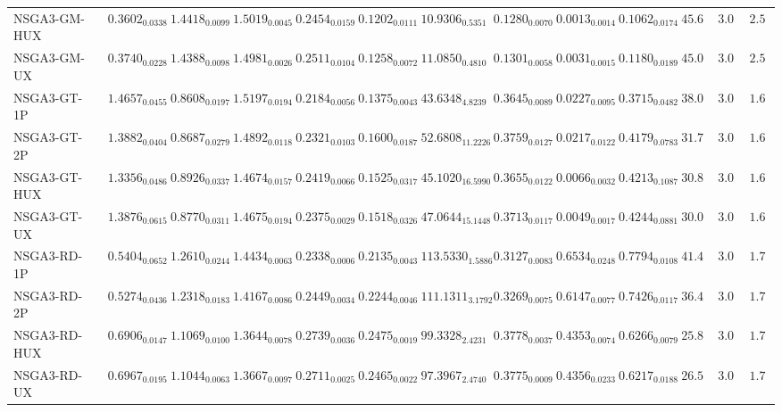 \documentclass[11pt,a4paper]{article}
\begin{document}
\begin{table}[H]
{\begin{tabular}{lcccccccccccc}
NSGA3-GM-HUX & $0.3602_{0.0338}$ & $1.4418_{0.0099}$ & $1.5019_{0.0045}$ & $0.2454_{0.0159}$ & $0.1202_{0.0111}$ & $10.9306_{0.5351}$ & $0.1280_{0.0070}$ & $\mathbf{0.0013}_{0.0014}$ & $0.1062_{0.0174}$ & $45.67$ & $3.00$ & $2.56$ \\
NSGA3-GM-UX & $0.3740_{0.0228}$ & $1.4388_{0.0098}$ & $1.4981_{0.0026}$ & $0.2511_{0.0104}$ & $0.1258_{0.0072}$ & $11.0850_{0.4810}$ & $0.1301_{0.0058}$ & $0.0031_{0.0015}$ & $0.1180_{0.0189}$ & $45.00$ & $3.00$ & $2.56$ \\
NSGA3-GT-1P & $1.4657_{0.0455}$ & $0.8608_{0.0197}$ & $1.5197_{0.0194}$ & $0.2184_{0.0056}$ & $0.1375_{0.0043}$ & $43.6348_{4.8239}$ & $0.3645_{0.0089}$ & $0.0227_{0.0095}$ & $0.3715_{0.0482}$ & $38.00$ & $3.00$ & $\mathbf{1.67}$ \\
NSGA3-GT-2P & $1.3882_{0.0404}$ & $0.8687_{0.0279}$ & $1.4892_{0.0118}$ & $0.2321_{0.0103}$ & $0.1600_{0.0187}$ & $52.6808_{11.2226}$ & $0.3759_{0.0127}$ & $0.0217_{0.0122}$ & $0.4179_{0.0783}$ & $31.78$ & $3.00$ & $\mathbf{1.67}$ \\
NSGA3-GT-HUX & $1.3356_{0.0486}$ & $0.8926_{0.0337}$ & $1.4674_{0.0157}$ & $0.2419_{0.0066}$ & $0.1525_{0.0317}$ & $45.1020_{16.5990}$ & $0.3655_{0.0122}$ & $0.0066_{0.0032}$ & $0.4213_{0.1087}$ & $30.89$ & $3.00$ & $\mathbf{1.67}$ \\
NSGA3-GT-UX & $1.3876_{0.0615}$ & $0.8770_{0.0311}$ & $1.4675_{0.0194}$ & $0.2375_{0.0029}$ & $0.1518_{0.0326}$ & $47.0644_{15.1448}$ & $0.3713_{0.0117}$ & $0.0049_{0.0017}$ & $0.4244_{0.0881}$ & $30.00$ & $3.00$ & $\mathbf{1.67}$ \\
NSGA3-RD-1P & $0.5404_{0.0652}$ & $1.2610_{0.0244}$ & $1.4434_{0.0063}$ & $0.2338_{0.0006}$ & $0.2135_{0.0043}$ & $\mathbf{113.5330}_{1.5886}$ & $0.3127_{0.0083}$ & $0.6534_{0.0248}$ & $0.7794_{0.0108}$ & $41.44$ & $3.00$ & $1.78$ \\
NSGA3-RD-2P & $0.5274_{0.0436}$ & $1.2318_{0.0183}$ & $1.4167_{0.0086}$ & $0.2449_{0.0034}$ & $0.2244_{0.0046}$ & $111.1311_{3.1792}$ & $0.3269_{0.0075}$ & $0.6147_{0.0077}$ & $0.7426_{0.0117}$ & $36.44$ & $3.00$ & $1.78$ \\
NSGA3-RD-HUX & $0.6906_{0.0147}$ & $1.1069_{0.0100}$ & $\mathbf{1.3644}_{0.0078}$ & $\mathbf{0.2739}_{0.0036}$ & $\mathbf{0.2475}_{0.0019}$ & $99.3328_{2.4231}$ & $0.3778_{0.0037}$ & $0.4353_{0.0074}$ & $0.6266_{0.0079}$ & $25.89$ & $3.00$ & $1.78$ \\
NSGA3-RD-UX & $0.6967_{0.0195}$ & $1.1044_{0.0063}$ & $\mathbf{1.3667}_{0.0097}$ & $\mathbf{0.2711}_{0.0025}$ & $\mathbf{0.2465}_{0.0022}$ & $97.3967_{2.4740}$ & $0.3775_{0.0009}$ & $0.4356_{0.0233}$ & $0.6217_{0.0188}$ & $26.56$ & $3.00$ & $1.78$ \\

\end{tabular}}
\end{table}
\end{document}
